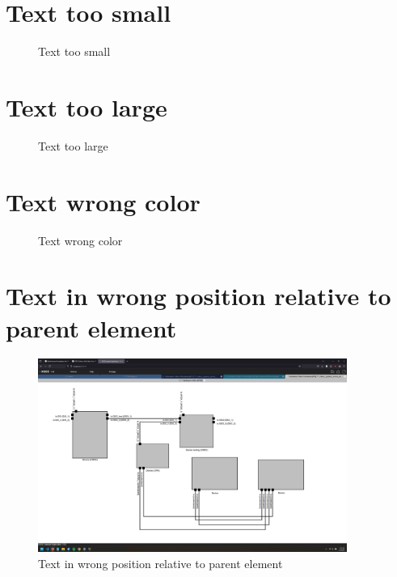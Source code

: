 \documentclass{article}
\begin{document}
\section{Text too small}
\begin{figure}[H]
    \centering
    \caption{Text too small}
\end{figure}
\newpage

\section{Text too large}
\begin{figure}[H]
    \centering
    \caption{Text too large}
\end{figure}
\newpage

\section{Text wrong color}
\begin{figure}[H]
    \centering
    \caption{Text wrong color}
\end{figure}
\newpage

\section{Text in wrong position relative to parent element}
\begin{figure}[H]
    \centering
    \includegraphics[width=0.9\textwidth]{images/text_in_wrong_position_relative_to_parent_element.png}
    \caption{Text in wrong position relative to parent element}
\end{figure}
\newpage
\end{document}
